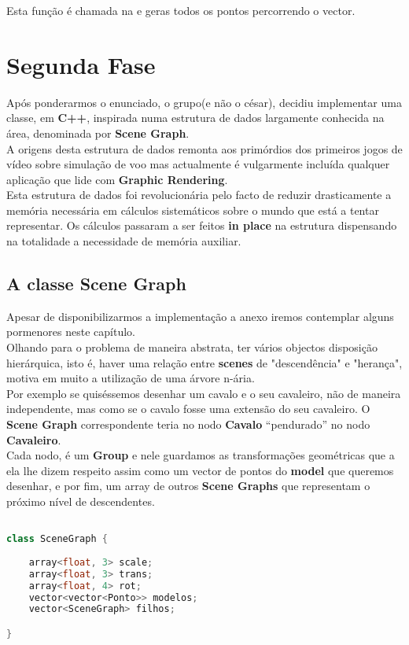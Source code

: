 \documentclass{article}
\begin{document}
Esta função é chamada na  e geras todos os pontos percorrendo o vector.

\newpage

\section{Segunda Fase}
Após ponderarmos o enunciado, o grupo(e não o césar), decidiu implementar uma classe, em \textbf{C++}, inspirada numa estrutura de dados largamente conhecida na área, denominada por \textbf{Scene Graph}.\\
A origens desta estrutura de dados remonta aos primórdios dos primeiros jogos de vídeo sobre simulação de voo mas actualmente é vulgarmente incluída qualquer aplicação que lide com \textbf{Graphic Rendering}.\\
Esta estrutura de dados foi revolucionária pelo facto de reduzir drasticamente a memória necessária em cálculos sistemáticos sobre o mundo que está a tentar representar. Os cálculos passaram a ser feitos \textbf{in place} na estrutura dispensando na totalidade a necessidade de memória auxiliar. 

\subsection{A classe Scene Graph}
Apesar de disponibilizarmos a implementação a anexo iremos contemplar alguns pormenores neste capítulo.\\
Olhando para o problema de maneira abstrata, ter vários objectos disposição hierárquica, isto é, haver uma relação entre \textbf{scenes} de "descendência" e "herança", motiva em muito a utilização de uma árvore n-ária.\\
Por exemplo se quiséssemos desenhar um cavalo e o seu cavaleiro, não de maneira independente, mas como se o cavalo fosse uma extensão do seu cavaleiro. O \textbf{Scene Graph} correspondente teria no nodo \textbf{Cavalo} “pendurado” no nodo \textbf{Cavaleiro}.\\
Cada nodo, é um \textbf{Group} e nele guardamos as transformações geométricas que a ela lhe dizem respeito assim como um vector de pontos do \textbf{model} que queremos desenhar, e por fim, um array de outros \textbf{Scene Graphs} que representam o próximo nível de descendentes.\\

\begin{file}
    \begin{lstlisting}[language=C++]

class SceneGraph {
    
    array<float, 3> scale;
    array<float, 3> trans;
    array<float, 4> rot;
    vector<vector<Ponto>> modelos;
    vector<SceneGraph> filhos;

}

    \end{lstlisting}
\end{file}
\end{document}
